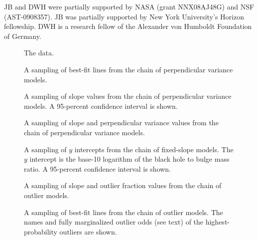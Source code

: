 \documentclass[12pt,preprint]{aastex}
\begin{document}
\acknowledgments JB and DWH were partially supported by NASA (grant
NNX08AJ48G) and NSF (AST-0908357).  JB was partially supported by New
York University's Horizon fellowship.  DWH is a research fellow of the
Alexander von Humboldt Foundation of Germany.

\clearpage
\begin{figure}
\caption{The data.}
\end{figure}

\clearpage
\begin{figure}
\caption{A sampling of best-fit lines from the chain of perpendicular
  variance models.}
\end{figure}

\clearpage
\begin{figure}
\caption{A sampling of slope values from the chain of perpendicular
  variance models.  A 95-percent confidence interval is shown.}
\end{figure}

\clearpage
\begin{figure}
\caption{A sampling of slope and perpendicular variance values from
  the chain of perpendicular variance models.}
\end{figure}

\clearpage
\begin{figure}
\caption{A sampling of $y$ intercepts from the chain of fixed-slope
  models.  The $y$ intercept is the base-10 logarithm of the black
  hole to bulge mass ratio.  A 95-percent confidence interval is
  shown.}
\end{figure}

\clearpage
\begin{figure}
\caption{A sampling of slope and outlier fraction values from the
  chain of outlier models.}
\end{figure}

\clearpage
\begin{figure}
\caption{A sampling of best-fit lines from the chain of outlier
  models.  The names and fully marginalized outlier odds (see text) of
  the highest-probability outliers are shown.}
\end{figure}
\end{document}
